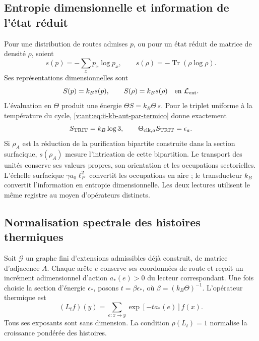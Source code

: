 \subsection{Entropie dimensionnelle et information de l'état réduit}

Pour une distribution de routes admises \(p\), ou pour un état réduit de matrice de densité \(\rho\), soient
\[
 s(p)=-\sum_xp_x\log p_x,\qquad
 s(\rho)=-\operatorname{Tr}(\rho\log\rho).
\]
Ses représentations dimensionnelles sont
\begin{equation}
 S(p)=k_Bs(p),\qquad S(\rho)=k_Bs(\rho)
 \quad\text{en }\mathcal L_{\rm ent}.
 \label{v:ant:eq:ii-kb-aut-entropia}
\end{equation}
L'évaluation en \(\Theta\) produit une énergie
\(\Theta S=k_B\Theta\,s\). Pour le triplet uniforme à la température
du cycle, \eqref{v:ant:eq:ii-kb-aut-par-termico} donne exactement
\[
 S_{\rm TRIT}=k_B\log3,\qquad
 \Theta_{{\rm clk},a}S_{\rm TRIT}=\epsilon_a.
\]
Si \(\rho_A\) est la réduction de la purification bipartite construite dans la section surfacique, \(s(\rho_A)\) mesure l'intrication de cette bipartition. Le transport des unités conserve ses valeurs propres, son orientation et les occupations sectorielles. L'échelle surfacique \(\gamma a_0\ell_P^2\) convertit les occupations en aire ; le transducteur \(k_B\) convertit l'information en entropie dimensionnelle. Les deux lectures utilisent le même registre au moyen d'opérateurs distincts.

\subsection{Normalisation spectrale des histoires thermiques}

Soit \(\mathcal G\) un graphe fini d'extensions admissibles déjà
construit, de matrice d'adjacence \(A\). Chaque arête \(e\) conserve
ses coordonnées de route et reçoit un incrément adimensionnel d'action
\(a_*(e)>0\) du lecteur correspondant. Une fois choisie la section d'énergie
\(\epsilon_*\), posons \(t=\beta\epsilon_*\), où
\(\beta=(k_B\Theta)^{-1}\). L'opérateur thermique est
\begin{equation}
 (L_tf)(y)=\sum_{e:x\to y}\exp[-t a_*(e)]f(x).
 \label{v:ant:eq:ii-kb-aut-operador}
\end{equation}
Tous ses exposants sont sans dimension. La condition
\(\rho(L_t)=1\) normalise la croissance pondérée des histoires.

